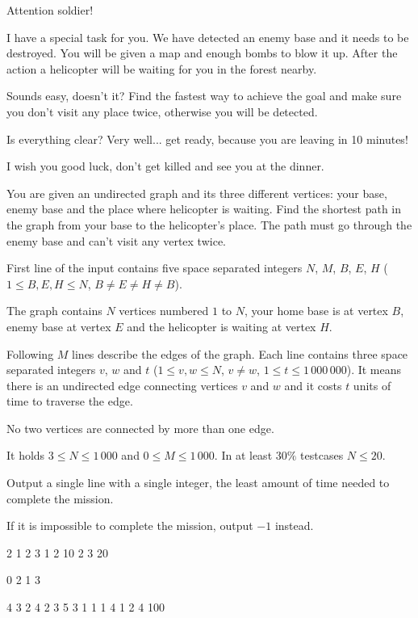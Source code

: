 

\noindent
Attention soldier!

\bigskip \noindent
I have a special task for you. We have detected an enemy base and it needs to be destroyed. You will be given a map and enough bombs to blow it up. After the action a helicopter will be waiting for you in the forest nearby.

\bigskip \noindent
Sounds easy, doesn't it? Find the fastest way to achieve the goal and make sure you don't visit any place twice, otherwise you will be detected.

\bigskip \noindent
Is everything clear? Very well... get ready, because you are leaving in 10 minutes!

\bigskip \noindent
I wish you good luck, don't get killed and see you at the dinner.


You are given an undirected graph and its three different vertices: your base, enemy base and the place where helicopter is waiting. Find the shortest path in the graph from your base to the helicopter's place. The path must go through the enemy base and can't visit any vertex twice.


First line of the input contains five space separated integers $N$, $M$, $B$, $E$, $H$
($1 \le B, E, H \le N$, $B \neq E \neq H \neq B$).

The graph contains $N$ vertices numbered $1$ to $N$, your home base is at vertex $B$, enemy base at vertex $E$ and the helicopter is waiting at vertex $H$.

Following $M$ lines describe the edges of the graph.
Each line contains three space separated integers $v$, $w$ and $t$ ($1 \le v, w \le N$, $v \neq w$, $1 \le t \le 1\,000\,000$).
It means there is an undirected edge connecting vertices $v$ and $w$ and it costs $t$ units of time to traverse the edge.

No two vertices are connected by more than one edge.

\smallskip
It holds $3 \le N \le 1\,000$ and $0 \le M \le 1\,000$.
In at least $30\%$ testcases $N\le 20$.


Output a single line with a single integer, the least amount of time needed to complete the mission.

If it is impossible to complete the mission, output $-1$ instead.



 2 1 2 3
1 2 10
2 3 20
\sampleEND


\bigskip


 0 2 1 3
\sampleEND


\bigskip


 4 3 2 4
2 3 5
3 1 1
1 4 1
2 4 100
\sampleEND


